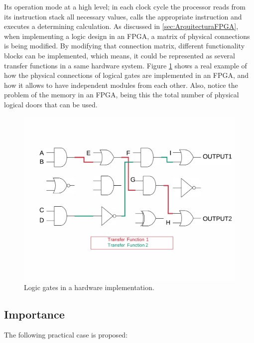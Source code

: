 Its operation mode at a high level; in each clock cycle the processor reads from its instruction stack all necessary values, calls the appropriate instruction and executes a determining calculation.\newline
As discussed in \ref{sec:ArquitecturaFPGA}, when implementing a logic design in an FPGA, a matrix of physical connections is being modified. By modifying that connection matrix, different functionality blocks can be implemented, which means, it could be represented as several transfer functions in a same hardware system.\newline
Figure \ref{fig:puertas_logicas} shows a real example of how the physical connections of logical gates are implemented in an FPGA, and how it allows to have independent modules from each other. Also, notice the problem of the memory in an FPGA, being this the total number of physical logical doors that can be used.
\begin{center}
\begin{figure}[H]
	\center
	\includegraphics[scale=0.3]{imagenes/EstadoArte/puertas_logicas.pdf}
	\caption{Logic gates in a hardware implementation.}
	\label{fig:puertas_logicas}
\end{figure}
\end{center} 

\subsection{Importance}

The following practical case is proposed:\newline

